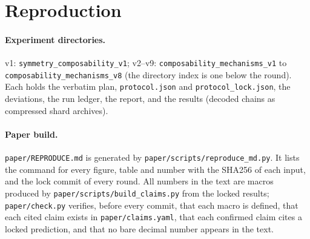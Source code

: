 \section{Reproduction}\label{app:reproduction}
\paragraph{Experiment directories.}
v1: \texttt{symmetry\_composability\_v1}; v2--v9: \texttt{composability\_mechanisms\_v1} to \texttt{composability\_mechanisms\_v8} (the directory index is one below the round). Each
holds the verbatim plan, \texttt{protocol.json} and \texttt{protocol\_lock.json}, the deviations, the run ledger, the report, and the
results (decoded chains as compressed shard archives).

\paragraph{Paper build.}
\texttt{paper/REPRODUCE.md} is generated by \texttt{paper/scripts/reproduce\_md.py}. It lists the command for every figure, table and
number with the SHA256 of each input, and the lock commit of every round. All numbers in the text are macros produced by
\texttt{paper/scripts/build\_claims.py} from the locked results; \texttt{paper/check.py} verifies, before every commit, that each macro
is defined, that each cited claim exists in \texttt{paper/claims.yaml}, that each confirmed claim cites a locked prediction, and that no
bare decimal number appears in the text.
